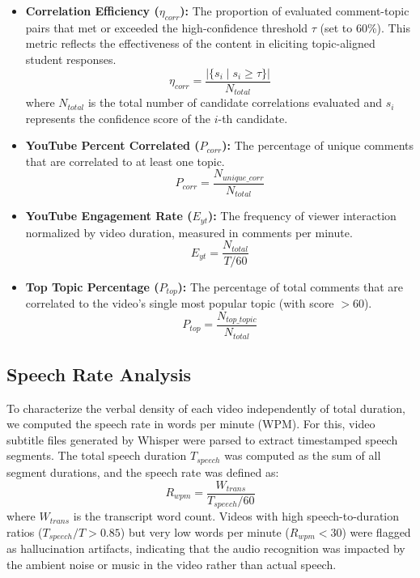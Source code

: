 \documentclass[fleqn,10pt]{JLA_article} %
\begin{document}
\begin{itemize}
    \item \textbf{Correlation Efficiency ($\eta_{corr}$):} The proportion of evaluated comment-topic pairs that met or exceeded the high-confidence threshold $\tau$ (set to 60\%). This metric reflects the effectiveness of the content in eliciting topic-aligned student responses.
    \begin{equation}
        \eta_{corr} = \frac{|\{s_i \mid s_i \ge \tau\}|}{N_{total}}
    \end{equation}
    where $N_{total}$ is the total number of candidate correlations evaluated and $s_i$ represents the confidence score of the $i$-th candidate.

    \item \textbf{YouTube Percent Correlated ($P_{corr}$):} The percentage of unique comments that are correlated to at least one topic.
    \begin{equation}
        P_{corr} = \frac{N_{unique\_corr}}{N_{total}}
    \end{equation}

    \item \textbf{YouTube Engagement Rate ($E_{yt}$):} The frequency of viewer interaction normalized by video duration, measured in comments per minute.
    \begin{equation}
        E_{yt} = \frac{N_{total}}{T / 60}
    \end{equation}

    \item \textbf{Top Topic Percentage ($P_{top}$):} The percentage of total comments that are correlated to the video's single most popular topic (with score $> 60$).
    \begin{equation}
        P_{top} = \frac{N_{top\_topic}}{N_{total}}
    \end{equation}
\end{itemize}

\subsection{Speech Rate Analysis}

To characterize the verbal density of each video independently of total duration, we computed the speech rate in words per minute (WPM). For this, video subtitle files generated by Whisper were parsed to extract timestamped speech segments. The total speech duration $T_{speech}$ was computed as the sum of all segment durations, and the speech rate was defined as:
\begin{equation}
    R_{wpm} = \frac{W_{trans}}{T_{speech} / 60}
\end{equation}
where $W_{trans}$ is the transcript word count. Videos with high speech-to-duration ratios ($T_{speech} / T > 0.85$) but very low words per minute ($R_{wpm} < 30$) were flagged as hallucination artifacts, indicating that the audio recognition was impacted by the ambient noise or music in the video rather than actual speech.
\end{document}
